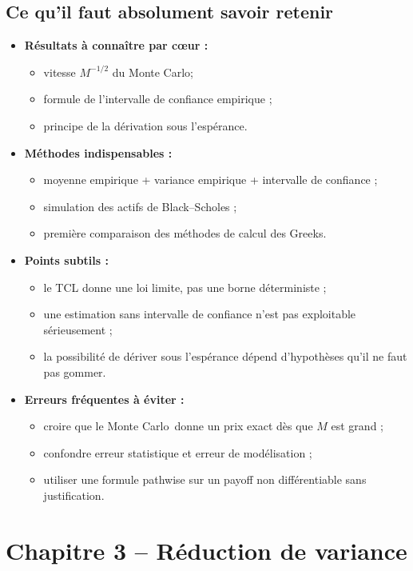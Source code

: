 \documentclass[11pt,a4paper]{article}
\newcommand{\mc}{Monte Carlo}
\begin{document}
\subsection{Ce qu'il faut absolument savoir retenir}

\begin{itemize}
  \item \textbf{Résultats à connaître par cœur :}
  \begin{itemize}
    \item vitesse $M^{-1/2}$ du \mc ;
    \item formule de l'intervalle de confiance empirique ;
    \item principe de la dérivation sous l'espérance.
  \end{itemize}
  \item \textbf{Méthodes indispensables :}
  \begin{itemize}
    \item moyenne empirique + variance empirique + intervalle de confiance ;
    \item simulation des actifs de Black--Scholes ;
    \item première comparaison des méthodes de calcul des Greeks.
  \end{itemize}
  \item \textbf{Points subtils :}
  \begin{itemize}
    \item le TCL donne une loi limite, pas une borne déterministe ;
    \item une estimation sans intervalle de confiance n'est pas exploitable sérieusement ;
    \item la possibilité de dériver sous l'espérance dépend d'hypothèses qu'il ne faut pas gommer.
  \end{itemize}
  \item \textbf{Erreurs fréquentes à éviter :}
  \begin{itemize}
    \item croire que le \mc\ donne un prix exact dès que $M$ est grand ;
    \item confondre erreur statistique et erreur de modélisation ;
    \item utiliser une formule pathwise sur un payoff non différentiable sans justification.
  \end{itemize}
\end{itemize}

\section{Chapitre 3 -- Réduction de variance}
\end{document}

